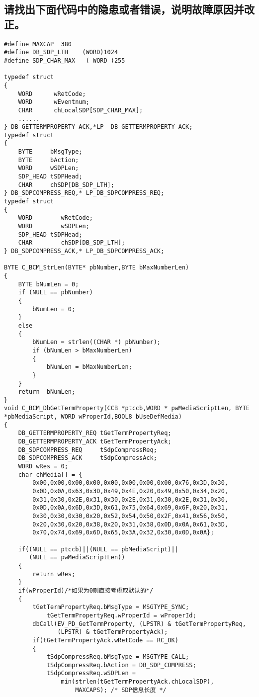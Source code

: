 ﻿\documentclass  [11pt,twocolumn,landscape]{article}
\begin{document}
\subsection{请找出下面代码中的隐患或者错误，说明故障原因并改正。}
\begin{lstlisting}
#define MAXCAP  380
#define DB_SDP_LTH    (WORD)1024
#define SDP_CHAR_MAX   ( WORD )255

typedef struct 
{
    WORD	  wRetCode;
	WORD  	  wEventnum;							 	
    CHAR      chLocalSDP[SDP_CHAR_MAX]; 
    ......
} DB_GETTERMPROPERTY_ACK,*LP_ DB_GETTERMPROPERTY_ACK;
typedef struct 
{
    BYTE     bMsgType;          
    BYTE     bAction;             
    WORD     wSDPLen;            
    SDP_HEAD tSDPHead;   		
    CHAR     chSDP[DB_SDP_LTH]; 
} DB_SDPCOMPRESS_REQ,* LP_DB_SDPCOMPRESS_REQ;
typedef struct
{
    WORD		wRetCode;			
    WORD		wSDPLen;			
    SDP_HEAD tSDPHead;			
    CHAR		chSDP[DB_SDP_LTH];						
} DB_SDPCOMPRESS_ACK,* LP_DB_SDPCOMPRESS_ACK;

BYTE C_BCM_StrLen(BYTE* pbNumber,BYTE bMaxNumberLen)
{
	BYTE bNumLen = 0;
	if (NULL == pbNumber)
	{
        bNumLen = 0;
	}
	else
	{
		bNumLen = strlen((CHAR *) pbNumber);
        if (bNumLen > bMaxNumberLen)
        {
            bNumLen = bMaxNumberLen;
        }
    }
	return  bNumLen;
}
void C_BCM_DbGetTermProperty(CCB *ptccb,WORD * pwMediaScriptLen, BYTE *pbMediaScript, WORD wProperId,BOOL8 bUseDefMedia)
{
	DB_GETTERMPROPERTY_REQ tGetTermPropertyReq;
	DB_GETTERMPROPERTY_ACK tGetTermPropertyAck;
	DB_SDPCOMPRESS_REQ     tSdpCompressReq;
	DB_SDPCOMPRESS_ACK     tSdpCompressAck;
	WORD wRes = 0;
	char chMedia[] = {
		0x00,0x00,0x00,0x00,0x00,0x00,0x00,0x00,0x76,0x3D,0x30,
        0x0D,0x0A,0x63,0x3D,0x49,0x4E,0x20,0x49,0x50,0x34,0x20,
        0x31,0x30,0x2E,0x31,0x30,0x2E,0x31,0x30,0x2E,0x31,0x30,
        0x0D,0x0A,0x6D,0x3D,0x61,0x75,0x64,0x69,0x6F,0x20,0x31,
        0x30,0x30,0x30,0x20,0x52,0x54,0x50,0x2F,0x41,0x56,0x50,
        0x20,0x30,0x20,0x38,0x20,0x31,0x38,0x0D,0x0A,0x61,0x3D,
        0x70,0x74,0x69,0x6D,0x65,0x3A,0x32,0x30,0x0D,0x0A};

	if((NULL == ptccb)||(NULL == pbMediaScript)||
       (NULL == pwMediaScriptLen))
	{
		return wRes;
	}
	if(wProperId)/*如果为0则直接考虑取默认的*/
	{
		tGetTermPropertyReq.bMsgType = MSGTYPE_SYNC;
        	tGetTermPropertyReq.wProperId = wProperId;
		dbCall(EV_PD_GetTermProperty, (LPSTR) & tGetTermPropertyReq,
               (LPSTR) & tGetTermPropertyAck);
		if(tGetTermPropertyAck.wRetCode == RC_OK)
		{
			tSdpCompressReq.bMsgType = MSGTYPE_CALL;
			tSdpCompressReq.bAction = DB_SDP_COMPRESS;
			tSdpCompressReq.wSDPLen =
                min(strlen(tGetTermPropertyAck.chLocalSDP),
                    MAXCAPS); /* SDP信息长度 */


\end{lstlisting}
\end{document}
